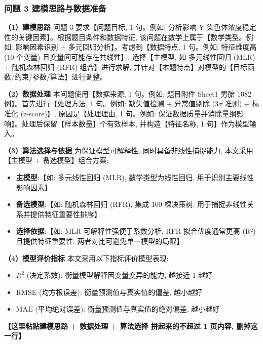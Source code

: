 
\subsubsection{问题 3 建模思路与数据准备}

\textbf{（1）建模思路} \quad 问题 3 要求【问题目标, 1 句。例如: 分析影响 Y 染色体浓度稳定性的关键因素】。根据题目条件和数据特征, 该问题在数学上属于【数学类型。例如: 影响因素识别 + 多元回归分析】。考虑到【数据特点, 1 句。例如: 特征维度高 (10 个变量) 且变量间可能存在共线性】, 选择【主模型, 如 多元线性回归 (MLR) + 随机森林回归 (RFR) 组合】进行求解, 并针对【本题特点】对模型的【目标函数/约束/参数/算法】进行调整。

\textbf{（2）数据处理} \quad 本问题使用【数据来源, 1 句。例如: 题目附件 Sheet1 男胎 1082 例】。首先进行【处理方法, 1 句。例如: 缺失值检测 + 异常值剔除 (3$\sigma$ 准则) + 标准化 (z-score)】, 原因是【处理理由, 1 句。例如: 保证数据质量并消除量纲影响】。处理后保留【样本数量】个有效样本, 并构造【特征名称, 1 句】作为模型输入。

\textbf{（3）算法选择与依据} \quad 为保证模型可解释性, 同时具备非线性捕捉能力, 本文采用【主模型 + 备选模型】组合方案:
\begin{itemize}
  \item \textbf{主模型}:【如: 多元线性回归 (MLR), 数学类型为线性回归, 用于识别主要线性影响因素】
  \item \textbf{备选模型}:【如: 随机森林回归 (RFR), 集成 100 棵决策树, 用于捕捉非线性关系并提供特征重要性排序】
  \item \textbf{选择依据}:【如: MLR 可解释性强便于系数分析, RFR 拟合优度通常更高 (R²) 且提供特征重要性, 两者对比可避免单一模型的局限】
\end{itemize}

\textbf{（4）模型评价指标} \quad 本文采用以下指标评价模型表现:
\begin{itemize}
  \item $R^2$ (决定系数): 衡量模型解释因变量变异的能力, 越接近 1 越好
  \item $\text{RMSE}$ (均方根误差): 衡量预测值与真实值的偏差, 越小越好
  \item $\text{MAE}$ (平均绝对误差): 衡量预测值与真实值的绝对偏差, 越小越好
\end{itemize}

\textbf{【这里粘贴建模思路 + 数据处理 + 算法选择 拼起来的不超过 1 页内容, 删掉这一行】}
